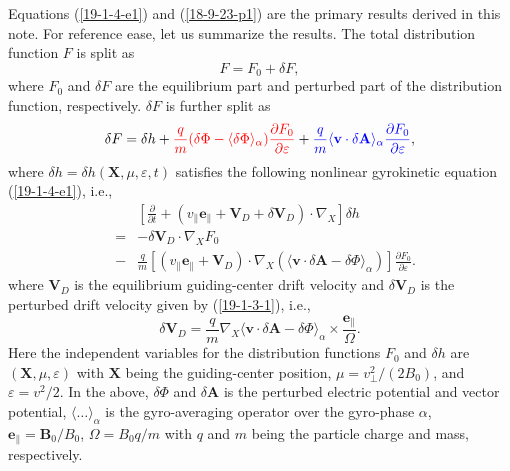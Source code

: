 \documentclass{llncs}
\newcommand{\tmcolor}[2]{{\color{#1}{#2}}}
\begin{document}
Equations (\ref{19-1-4-e1}) and (\ref{18-9-23-p1}) are the primary results
derived in this note. For reference ease, let us summarize the results. The
total distribution function $F$ is split as
\begin{equation}
  \label{19-1-4-6m} F = F_0 + \delta F,
\end{equation}
where $F_0$ and $\delta F$ are the equilibrium part and perturbed part of the
distribution function, respectively. $\delta F$ is further split as
\begin{equation}
  \label{19-1-3-e2m} \delta F = \delta h + \tmcolor{red}{\frac{q}{m} (\delta
  \Phi - \langle \delta \Phi \rangle_{\alpha}) \frac{\partial F_0}{\partial
  \varepsilon}} + \tmcolor{blue}{\frac{q}{m} \langle \mathbf{v} \cdot \delta
  \mathbf{A} \rangle_{\alpha} \frac{\partial F_0}{\partial \varepsilon}},
\end{equation}
where $\delta h = \delta h (\mathbf{X}, \mu, \varepsilon, t)$ satisfies the
following nonlinear gyrokinetic equation (\ref{19-1-4-e1}), i.e.,
\begin{eqnarray}
  &  & \left[ \frac{\partial}{\partial t} + (v_{\parallel}
  \mathbf{e}_{\parallel} +\mathbf{V}_D + \delta \mathbf{V}_D) \cdot \nabla_X
  \right] \delta h \nonumber\\
  & = & - \delta \mathbf{V}_D \cdot \nabla_X F_0 \nonumber\\
  & - & \frac{q}{m} [(v_{\parallel} \mathbf{e}_{\parallel} +\mathbf{V}_D)
  \cdot \nabla_X (\langle \mathbf{v} \cdot \delta \mathbf{A}- \delta \Phi
  \rangle_{\alpha})] \frac{\partial F_0}{\partial \varepsilon} . 
  \label{19-1-4-e1m}
\end{eqnarray}
where $\mathbf{V}_D$ is the equilibrium guiding-center drift velocity and
$\delta \mathbf{V}_D$ is the perturbed drift velocity given by
(\ref{19-1-3-1}), i.e.,
\begin{equation}
  \label{19-1-3-1m} \delta \mathbf{V}_D = \frac{q}{m} \nabla_X \langle
  \mathbf{v} \cdot \delta \mathbf{A}- \delta \Phi \rangle_{\alpha} \times
  \frac{\mathbf{e}_{\parallel}}{\Omega} .
\end{equation}
Here the independent variables for the distribution functions $F_0$ and
$\delta h$ are $(\mathbf{X}, \mu, \varepsilon)$ with $\mathbf{X}$ being the
guiding-center position, $\mu = v_{\perp}^2 / (2 B_0)$, and $\varepsilon = v^2
/ 2$. In the above, $\delta \Phi$ and $\delta \mathbf{A}$ is the perturbed
electric potential and vector potential, $\langle \ldots \rangle_{\alpha}$ is
the gyro-averaging operator over the gyro-phase $\alpha$, \
$\mathbf{e}_{\parallel} =\mathbf{B}_0 / B_0$, $\Omega = B_0 q / m$ with $q$
and $m$ being the particle charge and mass, respectively.
\end{document}

